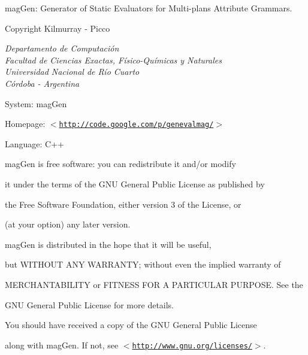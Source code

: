magGen: Generator of Static Evaluators for Multi-plans Attribute Grammars.\par
 Copyright Kilmurray - Picco\par

\textit{Departamento de Computaci\'on\\
        Facultad de Ciencias Exactas, F\'isico-Qu\'imicas y Naturales\\
        Universidad Nacional de R\'io Cuarto\\
        C\'ordoba - Argentina}

System: magGen\par
 Homepage: $<$\href{http://code.google.com/p/genevalmag/}{\tt http://code.google.com/p/genevalmag/}$>$\par
 Language: C++\par
 \par
 magGen is free software: you can redistribute it and/or modify\par
 it under the terms of the GNU General Public License as published by\par
 the Free Software Foundation, either version 3 of the License, or\par
 (at your option) any later version.\par


 magGen is distributed in the hope that it will be useful,\par
 but WITHOUT ANY WARRANTY; without even the implied warranty of\par
 MERCHANTABILITY or FITNESS FOR A PARTICULAR PURPOSE. See the\par
 GNU General Public License for more details.\par


 You should have received a copy of the GNU General Public License\par
 along with magGen. If not, see $<$\href{http://www.gnu.org/licenses/}{\tt http://www.gnu.org/licenses/}$>$.\par


